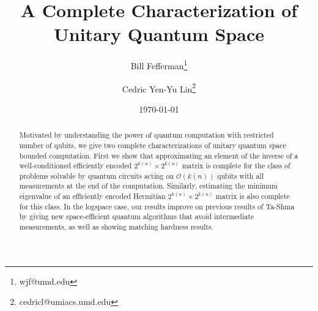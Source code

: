 \documentclass[11pt]{article}
\theoremstyle{definition}
\theoremstyle{remark}
\newcommand\QMA{{\sf{QMA}}}
\newcommand\PSPACE{{\sf{PSPACE}}}
\newcommand\bigoh{\mathcal{O}}
\begin{document}
\begin{titlepage}
\title{A Complete Characterization of Unitary Quantum Space}
\author[1]{Bill Fefferman\thanks{wjf@umd.edu}}
\author[1]{Cedric Yen-Yu Lin\thanks{cedricl@umiacs.umd.edu}}
\date{\today}
\maketitle
\begin{abstract}
%

Motivated by understanding the power of quantum computation with restricted number of qubits, we give two complete characterizations of unitary quantum space bounded computation.  First we show that approximating an element of the inverse of a well-conditioned efficiently encoded $2^{k(n)}\times 2^{k(n)}$ matrix is complete for the class of problems solvable by quantum circuits acting on $\bigoh(k(n))$ qubits with all measurements at the end of the computation.  Similarly, estimating the minimum eigenvalue of an efficiently encoded Hermitian $2^{k(n)}\times 2^{k(n)}$ matrix is also complete for this class. In the logspace case, our results improve on previous results of Ta-Shma \cite{tashma} by giving new space-efficient quantum algorithms that avoid intermediate measurements, as well as showing matching hardness results.


\end{abstract}
\end{titlepage}
\end{document}
